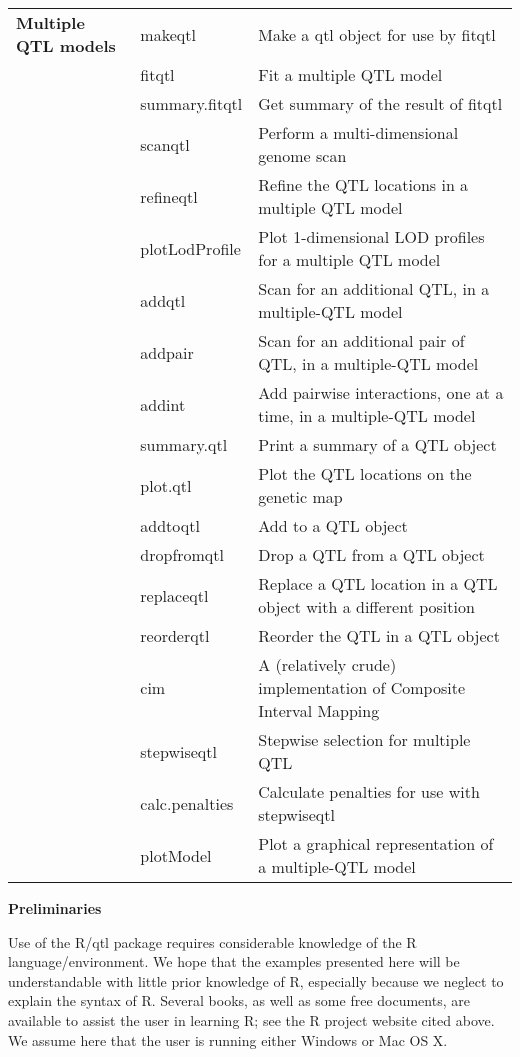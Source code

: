 \documentclass[10pt,letterpaper]{article}
\begin{document}
\begin{tabular}{lll}
\textbf{Multiple QTL models} 
& makeqtl & Make a qtl object for use by fitqtl \\ 
& fitqtl & Fit a multiple QTL model \\
& summary.fitqtl & Get summary of the result of fitqtl \\
& scanqtl & Perform a multi-dimensional genome scan \\
& refineqtl & Refine the QTL locations in a multiple QTL model \\
& plotLodProfile & Plot 1-dimensional LOD profiles for a multiple QTL
model \\
& addqtl & Scan for an additional QTL, in a 
multiple-QTL model \\
& addpair & Scan for an additional pair of QTL, in a 
multiple-QTL model \\
& addint & Add pairwise interactions, 
one at a time, in a multiple-QTL model \\
& summary.qtl & Print a summary of a QTL object \\
& plot.qtl & Plot the QTL locations on the genetic map \\
& addtoqtl & Add to a QTL object \\
& dropfromqtl & Drop a QTL from a QTL object \\
& replaceqtl & Replace a QTL location in a QTL object with a different
position \\
& reorderqtl & Reorder the QTL in a QTL object \\
& cim & A (relatively crude) implementation of Composite Interval
Mapping \\
& stepwiseqtl & Stepwise selection for multiple QTL \\
& calc.penalties & Calculate penalties for use with stepwiseqtl \\
& plotModel & Plot a graphical representation of a multiple-QTL model \\
\hline
\end{tabular} 
\newpage






\noindent \textbf{Preliminaries} \vspace{6pt}

\noindent Use of the R/qtl package requires considerable knowledge of
the R language/environment.  We hope that the examples presented here
will be understandable with little prior knowledge of R, especially
because we neglect to explain the syntax of R.  Several books, as well
as some free documents, are available to assist the user in learning
R; see the R project website cited above.  We assume here that the
user is running either Windows or Mac OS X.
\end{document}
